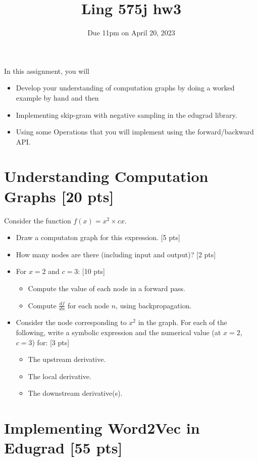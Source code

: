 \documentclass[11pt]{article}
\begin{document}
\title{Ling 575j hw3}
\date{\vspace{-0.2in}Due 11pm on April 20, 2023}
\maketitle


\noindent In this assignment, you will 
\begin{itemize}
  \item Develop your understanding of computation graphs by doing a worked example by hand and then
  \item Implementing skip-gram with negative sampling in the edugrad library.
  \item Using some Operations that you will implement using the forward/backward API.
\end{itemize}


\section{Understanding Computation Graphs [20 pts]}

  Consider the function $f(x) = x^2 \times cx$.
\begin{itemize}
  \item Draw a computaton graph for this expression. [5 pts]
  \item How many nodes are there (including input and output)? [2 pts]
  \item For $x = 2$ and $c=3$: [10 pts]
    \begin{itemize}
      \item Compute the value of each node in a forward pass.
      \item Compute $\frac{df}{dn}$ for each node $n$, using backpropagation.
    \end{itemize}
  \item Consider the node corresponding to $x^2$ in the graph.  For each of the following, write a symbolic expression and the numerical value (at $x=2$, $c=3$) for: [3 pts]
    \begin{itemize}
      \item The upstream derivative.
      \item The local derivative.
      \item The downstream derivative(s).
    \end{itemize}
\end{itemize}

\section{Implementing Word2Vec in Edugrad [55 pts]}
\end{document}
